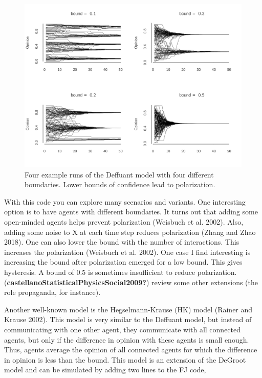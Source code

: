 \documentclass[
  a4paper,
  DIV=11,
  numbers=noendperiod,
  oneside]{scrreprt}
\begin{document}
\begin{figure}

{\centering \includegraphics{media/ch7/fig-ch7-img8-old-96.png}

}

\caption{\label{fig-ch7-img8-old-96}Four example runs of the Deffuant
model with four different boundaries. Lower bounds of confidence lead to
polarization.}

\end{figure}

With this code you can explore many scenarios and variants. One
interesting option is to have agents with different boundaries. It turns
out that adding some open-minded agents helps prevent polarization
(Weisbuch et al. 2002). Also, adding some noise to X at each time step
reduces polarization (Zhang and Zhao 2018). One can also lower the bound
with the number of interactions. This increases the polarization
(Weisbuch et al. 2002). One case I find interesting is increasing the
bound after polarization emerged for a low bound. This gives hysteresis.
A bound of 0.5 is sometimes insufficient to reduce polarization.
(\textbf{castellanoStatisticalPhysicsSocial2009?}) review some other
extensions (the role propaganda, for instance).

Another well-known model is the Hegselmann-Krause (HK) model (Rainer and
Krause 2002). This model is very similar to the Deffuant model, but
instead of communicating with one other agent, they communicate with all
connected agents, but only if the difference in opinion with these
agents is small enough. Thus, agents average the opinion of all
connected agents for which the difference in opinion is less than the
bound. This model is an extension of the DeGroot model and can be
simulated by adding two lines to the FJ code,
\end{document}
